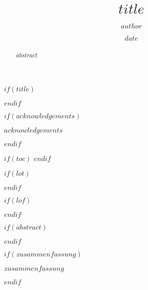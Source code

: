\documentclass[12pt,twoside]{reedthesis}
\title{$title$}
\author{$author$}
\date{$date$}
\newcommand\blankpage{%
    \null
    \thispagestyle{empty}%
    \addtocounter{page}{-1}%
    \newpage}
\begin{document}
$if(title)$
  \maketitle
$endif$


\afterpage{\blankpage} %

\frontmatter %
\pagestyle{empty} %

$if(acknowledgements)$
  \begin{acknowledgements}
    $acknowledgements$
  \end{acknowledgements}
$endif$



$if(toc)$
  \hypersetup{linkcolor=$if(toccolor)$$toccolor$$else$black$endif$}
  \setcounter{tocdepth}{$toc-depth$}
  \tableofcontents
$endif$


$if(lot)$
  \listoftables
$endif$


$if(lof)$
  \listoffigures
$endif$


$if(abstract)$
  \begin{abstract}
    $abstract$
  \end{abstract}
$endif$


$if(zusammenfassung)$
  \begin{zusammenfassung}
    $zusammenfassung$
  \end{zusammenfassung}
$endif$

\end{document}
